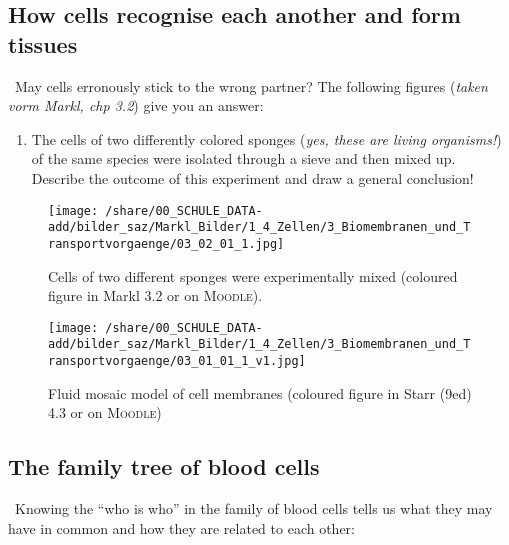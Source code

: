  \areaset[0cm]{15cm}{27.4cm}
\subsection{How cells recognise each another and form tissues}
\Pointinghand\, May cells erronously stick to the wrong partner? The following figures  (\textit{taken vorm Markl, chp 3.2}) give you an answer:

\begin{enumerate}[itemsep=1.5em, leftmargin=*]
\item  The cells of two differently colored sponges (\textit{yes, these are living organisms!}) of the same species were isolated through a sieve and then mixed up. Describe the outcome of this experiment and draw a general conclusion!
\end{enumerate}
			\vspace{1.4cm}
			\begin{figure}[htp]\centering
		  \texttt{[image: /share/00\_SCHULE\_DATA-add/bilder\_saz/Markl\_Bilder/1\_4\_Zellen/3\_Biomembranen\_und\_Transportvorgaenge/03\_02\_01\_1.jpg]}
		  \caption[Schwammzellen finden sich aus Markl 3.2]{Cells of two different sponges were experimentally mixed (coloured figure in Markl 3.2 or on  \textsc{Moodle}).}
		  \label{fig:SchwammZellen}
		\end{figure}

			\begin{figure}[htp] \centering
		  \texttt{[image: /share/00\_SCHULE\_DATA-add/bilder\_saz/Markl\_Bilder/1\_4\_Zellen/3\_Biomembranen\_und\_Transportvorgaenge/03\_01\_01\_1\_v1.jpg]}
		  \caption[Aufbau Zellmembran aus Markl 3.1]{Fluid mosaic model of cell membranes (coloured figure in Starr (9ed) 4.3 or on  \textsc{Moodle})}
		  \label{fig:ZellmembraneGlykolipide}
		\end{figure}

\clearpage
\subsection{The family tree of blood cells}
\Pointinghand\, Knowing the "`who is who"' in the family of blood cells tells us what they may have in common and how they are related to each other:

